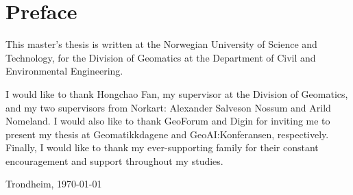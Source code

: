 \section*{Preface}

\begin{comment}
The Preface includes the facts: what type of project, where it is conducted,
who supervised, and any acknowledgements you wish to give.

This Master's Thesis template was created by Bj\"orn Gamb\"ack and is based on a template that he created for the 2016 ``Experts in Team'' course on
Computational Creativity (TDT4853) at the Norwegian University of Science and Technology (NTNU),
which in turn was heavily based on the 2014 AI Master's Thesis template created by Anders Kofod-Petersen ---
with some of the explaining text stemming from Anders' original template.

You may basically thank anybody you like (and avoid thanking anybody you do not like) and in any form you like.
However, it is a good idea to always thank people who made direct contributions, e.g., those whose data you have been given access to or those whose images you have been given permission to reproduce.

Some students choose to include the text of the original project description in the Preface. This is possible but not necessary,
in particular not if you have changed the theme somewhat over time.
The Preface of the Master's Thesis might also be a good place to introduce your Specialisation Project, in case you plan
on reusing some texts from it (since the Specialisation Project is not a published and easily accessible work, and might
not be known to your audience, neither your text in itself nor even the general concept as such).
\end{comment}

This master's thesis is written at the Norwegian University of Science and Technology, for the Division of Geomatics at the Department of Civil and Environmental Engineering.

I would like to thank Hongchao Fan, my supervisor at the Division of Geomatics, and my two supervisors from Norkart: Alexander Salveson Nossum and Arild Nomeland. I would also like to thank GeoForum and Digin for inviting me to present my thesis at Geomatikkdagene and GeoAI:Konferansen, respectively. Finally, I would like to thank my ever-supporting family for their constant encouragement and support throughout my studies.

\vfill

\hfill \thesisAuthor

\hfill Trondheim, \today
